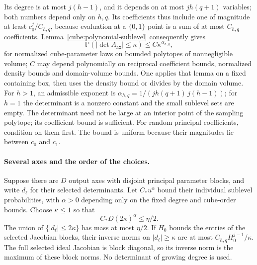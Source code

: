 Its degree is at most $j(h-1)$, and it depends on at most
$jh(q+1)$ variables; both numbers depend only on $h,q$. Its coefficients
thus include one of magnitude at least $c_0^j/C_{h,q}$, because evaluation
at a $\{0,1\}$ point is a sum of at most $C_{h,q}$ coefficients.
Lemma~\ref{cube:polynomial-sublevel} consequently gives
\[
 \mathbb P(|\det A_{\mathrm{ax}}|\leq\kappa)
 \leq C\kappa^{\alpha_{h,q}},
\]
for normalized cube-parameter laws on bounded polytopes of nonnegligible
volume; $C$ may depend polynomially on reciprocal coefficient bounds,
normalized density bounds and domain-volume bounds.  One applies
that lemma on a fixed containing box, then uses the density bound
or divides by the domain volume.  For $h>1$, an admissible exponent
is $\alpha_{h,q}=1/(jh(q+1)\,j(h-1))$; for $h=1$ the determinant
is a nonzero constant and the small sublevel sets are empty.
The determinant need not be large at an interior point of the
sampling polytope; its coefficient bound is sufficient.  For random
principal coefficients, condition on them first.  The bound is
uniform because their magnitudes lie between $c_0$ and $c_1$.

\paragraph{Several axes and the order of the choices.}
Suppose there are $D$ output axes with disjoint principal parameter
blocks, and write $d_\ell$ for their selected determinants.  Let
$C_*u^\alpha$ bound their individual sublevel probabilities, with
$\alpha>0$ depending only on the fixed degree and cube-order bounds.
Choose $\kappa\le1$ so that
\[
       C_*D(2\kappa)^\alpha\le\eta/2.
\]
The union of $\{|d_\ell|\le2\kappa\}$ has mass at most $\eta/2$.
If $H_0$ bounds the entries of the selected Jacobian blocks, their
inverse norms on $|d_\ell|\ge\kappa$ are at most
$C_{h,q}H_0^{j-1}/\kappa$.  The full selected ideal Jacobian is
block diagonal, so its inverse norm is the maximum of these block
norms.  No determinant of growing degree is used.

